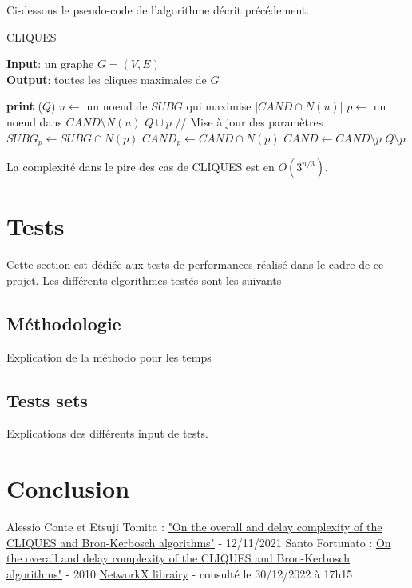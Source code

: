 \documentclass[a4paper, 12pt]{article}
\begin{document}
Ci-dessous le pseudo-code de l'algorithme décrit précédement.
\begin{algorithm}
  \caption{CLIQUES}
  \textbf{Input}: un graphe $G = (V,E)$\\
  \textbf{Output}: toutes les cliques maximales de $G$
  \begin{algorithmic}[1]
       
        \State \textbf{print} ($ Q $)
      \Else
        \State $u \gets$ un noeud de $SUBG$ qui maximise $|CAND \cap N(u)|$
          \State $p \gets$ un noeud dans $CAND \setminus N(u)$
          \State $ Q \cup p $ 
          \State // Mise à jour des paramètres
          \State $SUBG_p \gets SUBG \cap N(p)$
          \State $CAND_p \gets CAND \cap N(p)$
          \State {}
          \State $CAND \gets CAND \setminus {p}$
          \State $ Q \setminus p $ 
        \EndWhile
      \EndIf
    \EndProcedure
    \State {}
  \end{algorithmic}
\end{algorithm}

La complexité dans le pire des cas de CLIQUES est en $ O(3^{n/3}) $\cite{contetomita}.

\section{Tests}%
\label{sec:tests}
Cette section est dédiée aux tests de performances réalisé dans le cadre de ce projet. Les différents elgorithmes testés sont les suivants

\subsection{Méthodologie}%
\label{subsec:methodo}
Explication de la méthodo pour les temps

\subsection{Tests sets}%
\label{subsec:sets}

Explications des différents input de tests.


\section{Conclusion}


\newpage
\begin{thebibliography}{unsrt}
 Alessio Conte et Etsuji Tomita :  \href{https://doi.org/10.1016/j.tcs.2021.11.005}{"On the overall and delay complexity of the CLIQUES and Bron-Kerbosch algorithms"} -  12/11/2021
 Santo Fortunato : \href{https://doi.org/10.1016/j.physrep.2009.11.002}{\og On the overall and delay complexity of the CLIQUES and Bron-Kerbosch algorithms"} - 2010
 \href{https://networkx.org}{NetworkX librairy} - consulté le 30/12/2022 à 17h15
\end{thebibliography}
\end{document}
